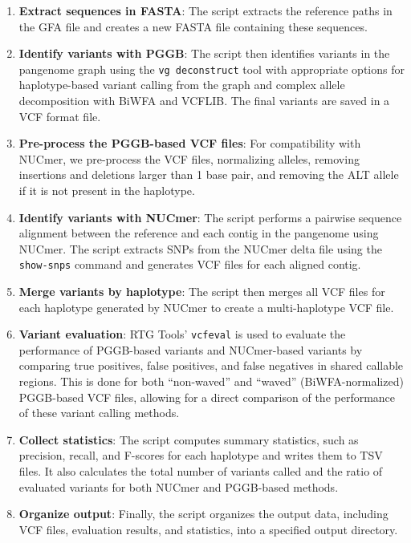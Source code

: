 \documentclass[pdflatex,mathphys]{jnl}%
\theoremstyle{thmstyleone}%
\theoremstyle{thmstyletwo}%
\theoremstyle{thmstylethree}%
\begin{document}
\begin{appendices}
\begin{enumerate}
    \item \textbf{Extract sequences in FASTA}: The script extracts the reference paths in the GFA file and creates a new FASTA file containing these sequences.
    \item \textbf{Identify variants with PGGB}: The script then identifies variants in the pangenome graph using the \texttt{vg deconstruct} tool with appropriate options for haplotype-based variant calling from the graph and complex allele decomposition with BiWFA and VCFLIB. The final variants are saved in a VCF format file.
    \item \textbf{Pre-process the PGGB-based VCF files}: For compatibility with NUCmer, we pre-process the VCF files, normalizing alleles, removing insertions and deletions larger than 1 base pair, and removing the ALT allele if it is not present in the haplotype.
    \item \textbf{Identify variants with NUCmer}: The script performs a pairwise sequence alignment between the reference and each contig in the pangenome using NUCmer. The script extracts SNPs from the NUCmer delta file using the \texttt{show-snps} command and generates VCF files for each aligned contig.
    \item \textbf{Merge variants by haplotype}: The script then merges all VCF files for each haplotype generated by NUCmer to create a multi-haplotype VCF file.
    \item \textbf{Variant evaluation}: RTG Tools' \texttt{vcfeval} is used to evaluate the performance of PGGB-based variants and NUCmer-based variants by comparing true positives, false positives, and false negatives in shared callable regions. This is done for both ``non-waved'' and ``waved'' (BiWFA-normalized) PGGB-based VCF files, allowing for a direct comparison of the performance of these variant calling methods.
    \item \textbf{Collect statistics}: The script computes summary statistics, such as precision, recall, and F-scores for each haplotype and writes them to TSV files. It also calculates the total number of variants called and the ratio of evaluated variants for both NUCmer and PGGB-based methods.
    \item \textbf{Organize output}: Finally, the script organizes the output data, including VCF files, evaluation results, and statistics, into a specified output directory.
\end{enumerate}


\end{appendices}
\end{document}

